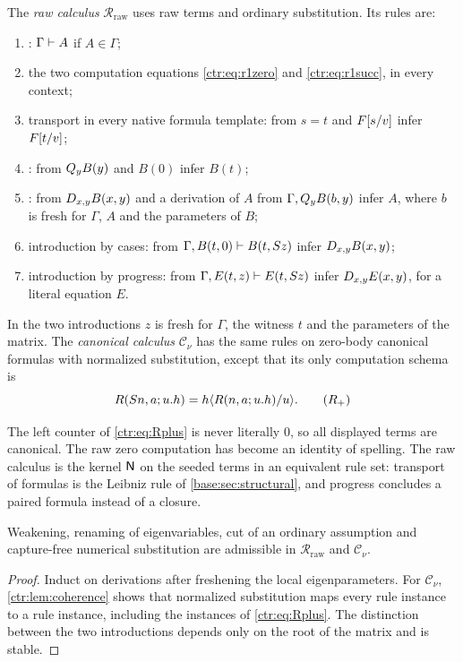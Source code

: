\begin{definition}\label{ctr:def:free}
The \emph{raw calculus} $\mathcal R_{\mathrm{raw}}$ uses raw terms and ordinary substitution.
Its rules are:
\begin{enumerate}
\item {}: $\Gamma\vdash A$ if $A\in\Gamma$;
\item the two computation equations \eqref{ctr:eq:r1zero} and \eqref{ctr:eq:r1succ}, in
every context;
\item transport in every native formula template: from $s=t$ and $F[s/v]$ infer
$F[t/v]$;
\item {}: from $Q_{y}B(y)$ and $B(0)$ infer $B(t)$;
\item {}: from $D_{x,y}B(x,y)$ and a derivation of $A$ from
$\Gamma,Q_{y}B(b,y)$ infer $A$, where $b$ is fresh for $\Gamma$, $A$ and the parameters of
$B$;
\item introduction by cases: from $\Gamma,B(t,0)\vdash B(t,S z)$ infer
$D_{x,y}B(x,y)$;
\item introduction by progress: from $\Gamma,E(t,z)\vdash E(t,S z)$ infer
$D_{x,y}E(x,y)$, for a literal equation $E$.
\end{enumerate}
In the two introductions $z$ is fresh for $\Gamma$, the witness $t$ and the parameters of the
matrix. The \emph{canonical calculus} $\mathcal C_\nu$ has the same rules on zero-body
canonical formulas with normalized substitution, except that its only computation schema is
\begin{equation}\label{ctr:eq:Rplus}
 R(S n,a;u.h)=h\langle R(n,a;u.h)/u\rangle . \tag{$R_+$}
\end{equation}
\end{definition}

The left counter of \eqref{ctr:eq:Rplus} is never literally $0$, so all displayed terms are
canonical. The raw zero computation has become an identity of spelling. The raw calculus is
the kernel $\mathsf{N}$ on the seeded terms in an equivalent rule set: transport of formulas is
the Leibniz rule of \cref{base:sec:structural}, and progress concludes a paired formula
instead of a closure.

\begin{lemma}\label{ctr:lem:struct}
Weakening, renaming of eigenvariables, cut of an ordinary assumption and capture-free
numerical substitution are admissible in $\mathcal R_{\mathrm{raw}}$ and $\mathcal C_\nu$.
\end{lemma}
\begin{proof}
Induct on derivations after freshening the local eigenparameters. For $\mathcal C_\nu$,
\cref{ctr:lem:coherence} shows that normalized substitution maps every rule instance to a
rule instance, including the instances of \eqref{ctr:eq:Rplus}. The distinction between the
two introductions depends only on the root of the matrix and is stable.
\end{proof}

